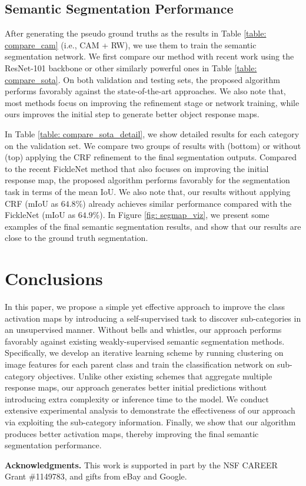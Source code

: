 \documentclass[10pt,twocolumn,letterpaper]{article}
\begin{document}
 \vspace{-2mm}
\subsection{Semantic Segmentation Performance}
After generating the pseudo ground truths as the results in Table \ref{table: compare_cam} (i.e., CAM + RW), we use them to train the semantic segmentation network.
We first compare our method with recent work using the ResNet-101 backbone or other similarly powerful ones in Table \ref{table: compare_sota}.
On both validation and testing sets, the proposed algorithm performs favorably against the  state-of-the-art approaches.
We also note that, most methods focus on improving the refinement stage or network training, while ours improves the initial step to generate better object response maps.


In Table \ref{table: compare_sota_detail}, we show detailed results for each category on the validation set.
We compare two groups of results with (bottom) or without (top) applying the CRF \cite{crf} refinement to the final segmentation outputs.
Compared to the recent FickleNet \cite{lee2019ficklenet} method that also focuses on improving the initial response map, the proposed algorithm performs favorably for the segmentation task in terms of the mean IoU.
We also note that, our results without applying CRF (mIoU as $64.8\%$) already achieves similar performance compared with the FickleNet (mIoU as $64.9\%$).
In Figure \ref{fig: segmap_viz}, we present some examples of the final semantic segmentation results, and show that our results are close to the ground truth segmentation.






\section{Conclusions}
In this paper, we propose a simple yet effective approach to improve the class activation maps by introducing a self-supervised task to discover sub-categories in an unsupervised manner. Without bells and whistles, our approach performs favorably against existing weakly-supervised semantic segmentation methods.
Specifically, we develop an iterative learning scheme by running clustering on image features for each parent class and train the classification network on sub-category objectives.
Unlike other existing schemes that aggregate multiple response maps, our approach generates better initial predictions without introducing extra complexity or inference time to the model.
We conduct extensive experimental analysis to demonstrate the effectiveness of our approach via exploiting the sub-category information.
Finally, we show that our algorithm produces better activation maps, thereby improving the final semantic segmentation performance.


\vspace{-3mm}
{\flushleft \bf{Acknowledgments.}}
This work is supported in part by the NSF CAREER Grant \#1149783, and gifts from eBay and Google.

{\small


}
\end{document}
